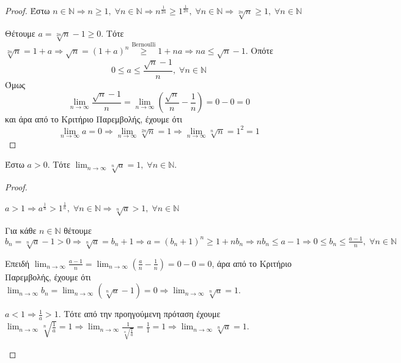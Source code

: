 \begin{proof}
  Έστω $ n \in \mathbb{N} \Rightarrow n \geq 1, \; \forall n \in 
  \mathbb{N} \Rightarrow n ^{\frac{1}{2n}} \geq 1^{\frac{1}{2n}}, \; 
  \forall n \in \mathbb{N} \Rightarrow \sqrt[2n]{n} \geq 1, \; \forall n 
  \in \mathbb{N} $

  Θέτουμε $ a = \sqrt[2n]{n} -1 \geq 0 $. Τότε $ \sqrt[2n]{n} = 1 + a 
  \Rightarrow \sqrt{n} = (1+a)^{n} \overset{\text{Bernoulli}}{\geq} 1 
  + na \Rightarrow na \leq \sqrt{n} - 1  $. Οπότε 
  \[ 
    0 \leq a \leq \frac{\sqrt{n} -1}{n}, \; \forall n \in \mathbb{N}
  \] 
  Όμως
  \[ 
    \lim_{n \to \infty} \frac{\sqrt{n} -1}{n} = \lim_{n \to \infty} 
    \left( \frac{\sqrt{n}}{n} - \frac{1}{n}\right) = 0 - 0 = 0 
  \] 
  και άρα από το Κριτήριο Παρεμβολής, έχουμε ότι 
  \[ 
    \lim_{n \to \infty} a = 0 
    \Rightarrow \lim_{n \to \infty} \sqrt[2n]{n} = 1 \Rightarrow \lim_{n \to
    \infty} \sqrt[n]{n} = 1^{2} = 1 
  \]
\end{proof}

\begin{mybox3}
  \begin{prop}
    Έστω $ a>0 $. Τότε $ \lim_{n \to \infty} \sqrt[n]{a}=1, \; \forall n \in
    \mathbb{N} $.
  \end{prop}
\end{mybox3}

\begin{proof}
\item {}
  \begin{myitemize}[labelindent=1em]
    \item $ a>1 \Rightarrow a^{\frac{1}{n}} > 1^{\frac{1}{n}}, \; 
      \forall n \in \mathbb{N} \Rightarrow \sqrt[n]{a} >1, \; 
      \forall n \in \mathbb{N} $

      Για κάθε $ n \in \mathbb{N} $ θέτουμε $ b_{n} = \sqrt[n]{a} -1 
      > 0 \Rightarrow \sqrt[n]{a} = b_{n} + 1 \Rightarrow a = (
      b_{n}+1)^{n} \geq 1 + n b_{n} \Rightarrow n b_{n} \leq a-1
      \Rightarrow 0 \leq b_{n} \leq \frac{a-1}{n}, \; \forall n \in
      \mathbb{N} $

      Επειδή $ \lim_{n \to \infty} \frac{a-1}{n} = \lim_{n \to \infty}
      \left(\frac{a}{n} - \frac{1}{n}\right) = 0 - 0 = 0 $, άρα από το 
      Κριτήριο Παρεμβολής, έχουμε ότι $ \lim_{n \to \infty} b_{n} = 
      \lim_{n \to \infty} (\sqrt[n]{a}-1) = 0 \Rightarrow \lim_{n \to
      \infty} \sqrt[n]{a} =1 $.

    \item $ a< 1 \Rightarrow \frac{1}{a} > 1 $. Τότε από την 
      προηγούμενη πρόταση έχουμε 
      $ \lim_{n \to \infty} \sqrt[n]{\frac{1}{a} } = 1 \Rightarrow 
      \lim_{n \to \infty} \frac{1}{\sqrt[n]{\frac{1}{a}}} = 
      \frac{1}{1} = 1 \Rightarrow \lim_{n \to \infty} \sqrt[n]{a} 
      = 1$.
  \end{myitemize}
\end{proof}

